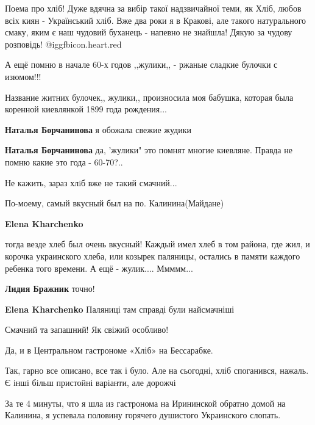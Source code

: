 \begin{itemize}

Поема про хліб! Дуже вдячна за вибір такої надзвичайної теми, як Хліб, любов
всіх киян - Український хліб. Вже два роки я в Кракові, але такого натурального
смаку, яким є наш чудовий буханець - напевно не знайшла! Дякую за чудову
розповідь! @igg{fbicon.heart.red}



А ещё помню в начале 60-х годов ,,жулики,, - ржаные сладкие булочки с изюмом!!!

Название житних булочек,, жулики,, произносила моя бабушка, которая была
коренной киевлянкой 1899 года рождения...

\begin{itemize} %
\textbf{Наталья Борчанинова} я обожала свежие жудики

\textbf{Наталья Борчанинова} да, 'жулики" это помнят многие киевляне. Правда не помню какие это года - 60-70?..
\end{itemize} %

Не кажить, зараз хлiб вже не такий смачний...

По-моему, самый вкусный был на по. Калинина(Майдане)

\begin{itemize} %
\textbf{Elena Kharchenko} 

тогда везде хлеб был очень вкусный! Каждый имел хлеб в том района, где жил, и
корочка украинского хлеба, или козырек паляницы, остались в памяти каждого
ребенка того времени. А ещё - жулик.... Ммммм...

\textbf{Лидия Бражник} точно!

\textbf{Elena Kharchenko} Паляниці там справді були найсмачніші
\end{itemize} %

Смачний та запашний! Як свіжий особливо!

Да, и в Центральном гастрономе «Хліб» на Бессарабке.


Так, гарно все описано, все так і було. Але на сьогодні, хліб споганився,
нажаль. Є інші більш пристойні варіанти, але дорожчі



За те 4 минуты, что я шла из гастронома на Ирининской обратно домой на
Калинина, я успевала половину горячего душистого Украинского слопать.


\end{itemize}
